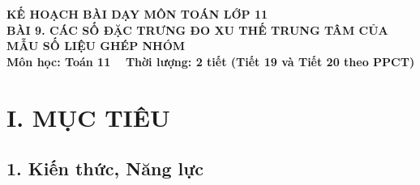 \documentclass[12pt, a4paper]{article}
\begin{document}
\begin{center}
    {\fontsize{14pt}{17pt}\selectfont \textbf{KẾ HOẠCH BÀI DẠY MÔN TOÁN LỚP 11}}\\[6pt]
    {\fontsize{16pt}{19pt}\selectfont \textbf{BÀI 9. CÁC SỐ ĐẶC TRƯNG ĐO XU THẾ TRUNG TÂM CỦA MẪU SỐ LIỆU GHÉP NHÓM}}\\[4pt]
    {\fontsize{12pt}{15pt}\selectfont \textbf{Môn học: Toán 11} \ \textbar \ \textbf{Thời lượng: 2 tiết (Tiết 19 và Tiết 20 theo PPCT)}}
\end{center}

\vspace{5pt}

\section*{I. MỤC TIÊU}

\subsection*{1. Kiến thức, Năng lực}
\end{document}
